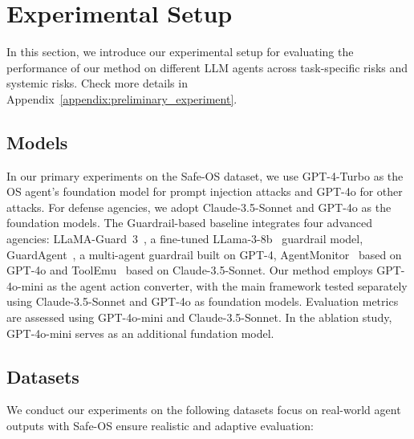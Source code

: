 \section{Experimental Setup}
In this section, we introduce our experimental setup for evaluating the performance of our method on different LLM agents across task-specific risks and systemic risks. Check more details in Appendix~\ref{appendix:preliminary_experiment}.
\subsection{Models} 
In our primary experiments on the Safe-OS dataset, we use GPT-4-Turbo as the OS agent's foundation model for prompt injection attacks and GPT-4o for other attacks. For defense agencies, we adopt Claude-3.5-Sonnet and GPT-4o as the foundation models. The Guardrail-based baseline integrates four advanced agencies: LLaMA-Guard~3~\cite{llama_guard_3_8b}, a fine-tuned LLama-3-8b~\cite{meta_llama_3_8b_instruct} guardrail model, GuardAgent~\cite{xiang2024guardagentsafeguardllmagents}, a multi-agent guardrail built on GPT-4, AgentMonitor~\cite{naihin2023testinglanguagemodelagents} based on GPT-4o and ToolEmu~\cite{ruan2024toolemu} based on Claude-3.5-Sonnet. Our method employs GPT-4o-mini as the agent action converter, with the main framework tested separately using Claude-3.5-Sonnet and GPT-4o as foundation models. Evaluation metrics are assessed using GPT-4o-mini and Claude-3.5-Sonnet. In the ablation study, GPT-4o-mini serves as an additional fundation model.
\subsection{Datasets}
We conduct our experiments on the following datasets focus on real-world agent outputs with Safe-OS  ensure realistic and adaptive evaluation:


